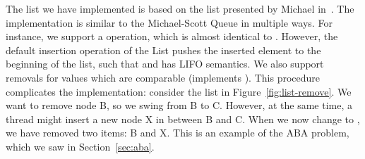 \documentclass[b5paper]{report}
\begin{document}
The list we have implemented is based on the list presented by Michael
in~\cite{michael2002high}. The implementation is similar to the Michael-Scott
Queue in multiple ways. For instance, we support a 
operation, which is almost identical to . However, the default
insertion operation of the List pushes the inserted element to the beginning of
the list, such that  and  has LIFO
semantics. We also support removals for values which are comparable (implements
).  This
procedure complicates the implementation: consider the list in
Figure~\ref{fig:list-remove}. We want to remove node B, so we swing
 from B to C. However, at the same time, a thread might insert a
new node X in between B and C. When we now change  to , we
have removed two items: B and X. This is an example of the ABA problem, which we
saw in Section~\ref{sec:aba}.
\end{document}
